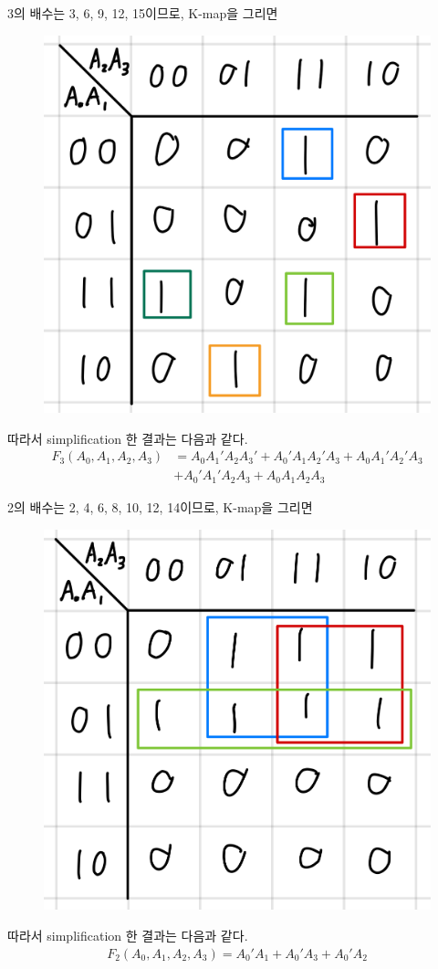 \documentclass{scrartcl}
\begin{document}
3의 배수는 3, 6, 9, 12, 15이므로, K-map을 그리면
\begin{figure}[H]
  \centering
  \includegraphics[width=0.3\linewidth]{lab3_2_3_km}
\end{figure}
따라서 simplification 한 결과는 다음과 같다.
\begin{align*}
  F_3(A_0, A_1, A_2, A_3) &= A_0 A_1' A_2 A_3' + A_0' A_1 A_2' A_3 + A_0 A_1' A_2' A_3 \\
                          &+ A_0' A_1' A_2 A_3 + A_0 A_1 A_2 A_3
\end{align*}

2의 배수는 2, 4, 6, 8, 10, 12, 14이므로, K-map을 그리면
\begin{figure}[H]
  \centering
  \includegraphics[width=0.3\linewidth]{lab3_2_2_km}
\end{figure}
따라서 simplification 한 결과는 다음과 같다.
\begin{align*}
  F_2(A_0, A_1, A_2, A_3) = A_0' A_1 + A_0' A_3 + A_0' A_2
\end{align*}
\end{document}
